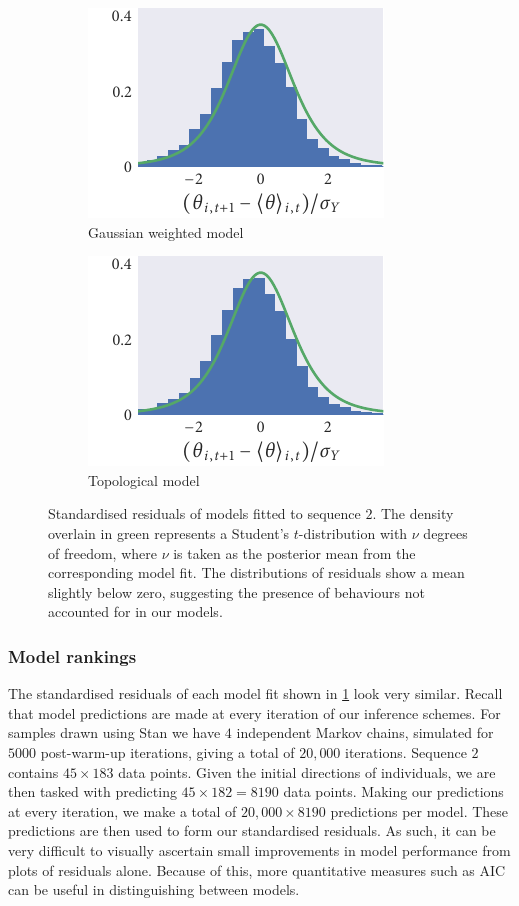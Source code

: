 \begin{figure}[tbp]
\begin{subfigure}[t]{0.33333\textwidth}
  \end{subfigure}%
  \begin{subfigure}[t]{0.33333\textwidth}
    \includegraphics{seq2/gauss_residuals.pdf}
    \caption{Gaussian weighted model}
  \end{subfigure}%
  \begin{subfigure}[t]{0.33333\textwidth}
    \includegraphics{seq2/top_residuals.pdf}
    \caption{Topological model}
  \end{subfigure}
  \caption{Standardised residuals of models fitted to sequence $2$. The density
    overlain in green represents a Student's $t$-distribution with $\nu$ degrees
    of freedom, where $\nu$ is taken as the posterior mean from the corresponding
    model fit. The distributions of residuals show a mean slightly below zero,
    suggesting the presence of behaviours not accounted for in our models.}
  \label{fig:residuals_seq2}
\end{figure}

\subsubsection{Model rankings}

The standardised residuals of each model fit shown in \cref{fig:residuals_seq2}
look very similar. Recall that model predictions are made at every iteration of
our inference schemes. For samples drawn using Stan we have $4$ independent
Markov chains, simulated for $5000$ post-warm-up iterations, giving a total of
$20,000$ iterations. Sequence $2$ contains $45\times183$ data points. Given the
initial directions of individuals, we are then tasked with predicting
$45\times182=8190$ data points. Making our predictions at every iteration, we
make a total of $20,000\times8190$ predictions per model. These predictions are
then used to form our standardised residuals. As such, it can be very difficult
to visually ascertain small improvements in model performance from plots of
residuals alone. Because of this, more quantitative measures such as AIC can be
useful in distinguishing between models.

